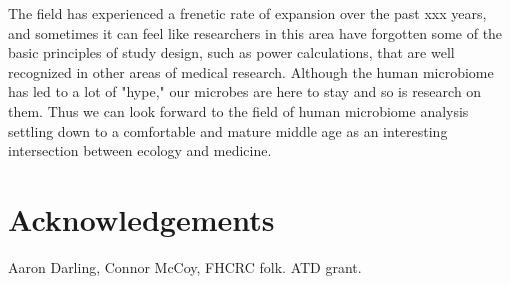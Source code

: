 \documentclass{amsart}
\newcommand{\forarxiv}[1]{#1}
\newcommand{\notforarxiv}[1]{}
\newcommand{\FIGmassTransport}{\
\begin{figure}[ht]
\begin{center}
  \forarxiv{\texttt{[image: mass\_transport.pdf]}}
\end{center}
\caption{\
  Caption goes here.
}
\label{FIGmassTransport}
\end{figure}
}
\begin{document}
The field has experienced a frenetic rate of expansion over the past xxx years, and sometimes it can feel like researchers in this area have forgotten some of the basic principles of study design, such as power calculations, that are well recognized in other areas of medical research.
Although the human microbiome has led to a lot of "hype," our microbes are here to stay and so is research on them.
Thus we can look forward to the field of human microbiome analysis settling down to a comfortable and mature middle age as an interesting intersection between ecology and medicine.


\section{Acknowledgements}
Aaron Darling, Connor McCoy,
FHCRC folk.
ATD grant.


\notforarxiv{
\newpage
\section{Figure Legends}
\clearpage

\newpage
}



\end{document}
